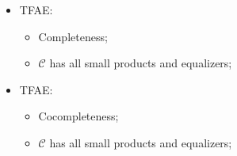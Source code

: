 \documentclass[Total.tex]{subfiles}
\begin{document}
				\begin{proposition}
					\begin{itemize}
						\item TFAE:
							\begin{itemize}
								\item Completeness;
								\item $\mathcal{C}$ has all small products and equalizers;
							\end{itemize}
						\item TFAE: 
						\begin{itemize}
							\item Cocompleteness;
							\item $\mathcal{C}$ has all small products and equalizers;
						\end{itemize}
					\end{itemize}
				\end{proposition}
\end{document}
